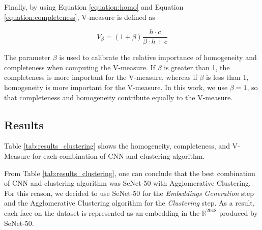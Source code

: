 Finally, by using Equation \ref{equation:homo} and Equation \ref{equation:completeness}, V-measure is defined as 

\begin{equation}
    V_{\beta} = (1+\beta)\frac{h\cdot c}{\beta\cdot{h+c}}
\end{equation}
\vspace{0.7em}

The parameter $\beta$ is used to calibrate the relative importance of homogeneity and completeness when computing the V-measure. If $\beta$ is greater than 1, the completeness is more important for the V-measure, whereas 
if $\beta$ is less than 1, homogeneity is more important for the V-measure. 
In this work, we use $\beta = 1$, so that completeness and homogeneity contribute equally to the V-measure.

\subsection{Results}
\label{subsec:results}

Table \ref{tab:results_clustering} shows the homogeneity, completeness, and V-Measure for each combination of CNN and clustering algorithm.

From Table \ref{tab:results_clustering}, one can conclude that the best combination of CNN and clustering algorithm was SeNet-50 with Agglomerative Clustering.
For this reason, we decided to use SeNet-50 for the \emph{Embeddings Generation} step and the Agglomerative Clustering algorithm for the \emph{Clustering} step.
As a result, each face on the dataset is represented as an embedding in the $\mathbb{R}^{2048}$ produced by SeNet-50.

